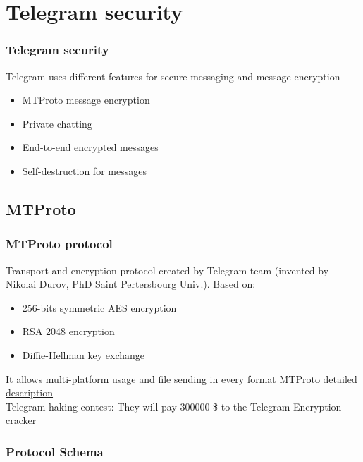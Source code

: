 \documentclass{beamer}
\begin{document}
\section{Telegram security}

\begin{frame}
\frametitle{Telegram security}
Telegram uses different features for secure messaging and message encryption
\begin{itemize}
\item MTProto message encryption
\item Private chatting
\item End-to-end encrypted messages
\item Self-destruction for messages
\end{itemize}
\end{frame}

\subsection{MTProto}

\begin{frame}
\frametitle{MTProto protocol}
Transport and encryption protocol created by Telegram team (invented by Nikolai Durov, PhD Saint Pertersbourg Univ.).
Based on:
\begin{itemize}
\item 256-bits symmetric AES encryption
\item RSA 2048 encryption
\item Diffie-Hellman key exchange
\end{itemize}
It allows multi-platform usage and file sending in every format
\href{https://core.telegram.org/mtproto/description}{\color{blue}MTProto detailed description} \\
Telegram haking contest: They will pay 300000 \$ to the Telegram Encryption cracker
\end{frame}

\subsubsection{Protocol Schema}
\end{document}
